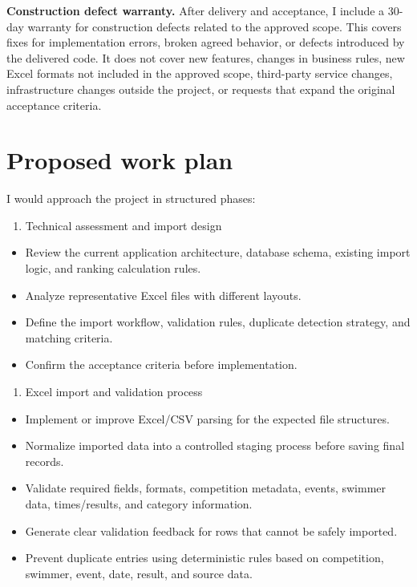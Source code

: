 \documentclass[11pt,a4paper]{article}
\begin{document}
\textbf{Construction defect warranty.} After delivery and acceptance, I include a 30-day warranty for construction defects related to the approved scope. This covers fixes for implementation errors, broken agreed behavior, or defects introduced by the delivered code. It does not cover new features, changes in business rules, new Excel formats not included in the approved scope, third-party service changes, infrastructure changes outside the project, or requests that expand the original acceptance criteria.\par

\section*{Proposed work plan}

I would approach the project in structured phases:\par

\begin{enumerate}
\item Technical assessment and import design
\end{enumerate}

\begin{itemize}
\item Review the current application architecture, database schema, existing import logic, and ranking calculation rules.
\item Analyze representative Excel files with different layouts.
\item Define the import workflow, validation rules, duplicate detection strategy, and matching criteria.
\item Confirm the acceptance criteria before implementation.
\end{itemize}

\begin{enumerate}
\item Excel import and validation process
\end{enumerate}

\begin{itemize}
\item Implement or improve Excel/CSV parsing for the expected file structures.
\item Normalize imported data into a controlled staging process before saving final records.
\item Validate required fields, formats, competition metadata, events, swimmer data, times/results, and category information.
\item Generate clear validation feedback for rows that cannot be safely imported.
\item Prevent duplicate entries using deterministic rules based on competition, swimmer, event, date, result, and source data.
\end{itemize}
\end{document}
